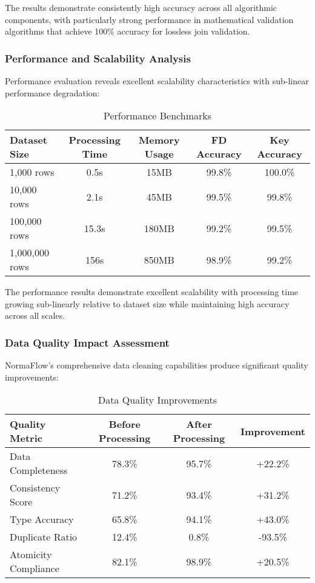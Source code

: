 \documentclass[acmsmall]{acmart}
\begin{document}
The results demonstrate consistently high accuracy across all algorithmic components, with particularly strong performance in mathematical validation algorithms that achieve 100\% accuracy for lossless join validation.

\subsubsection{Performance and Scalability Analysis}

Performance evaluation reveals excellent scalability characteristics with sub-linear performance degradation:

\begin{table}[h]
\centering
\caption{Performance Benchmarks}
\label{tab:performance_results}
\begin{tabular}{|l|c|c|c|c|}
\hline
\textbf{Dataset Size} & \textbf{Processing Time} & \textbf{Memory Usage} & \textbf{FD Accuracy} & \textbf{Key Accuracy} \\
\hline
1,000 rows & 0.5s & 15MB & 99.8\% & 100.0\% \\
10,000 rows & 2.1s & 45MB & 99.5\% & 99.8\% \\
100,000 rows & 15.3s & 180MB & 99.2\% & 99.5\% \\
1,000,000 rows & 156s & 850MB & 98.9\% & 99.2\% \\
\hline
\end{tabular}
\end{table}

The performance results demonstrate excellent scalability with processing time growing sub-linearly relative to dataset size while maintaining high accuracy across all scales.

\subsubsection{Data Quality Impact Assessment}

NormaFlow's comprehensive data cleaning capabilities produce significant quality improvements:

\begin{table}[h]
\centering
\caption{Data Quality Improvements}
\label{tab:quality_results}
\begin{tabular}{|l|c|c|c|}
\hline
\textbf{Quality Metric} & \textbf{Before Processing} & \textbf{After Processing} & \textbf{Improvement} \\
\hline
Data Completeness & 78.3\% & 95.7\% & +22.2\% \\
Consistency Score & 71.2\% & 93.4\% & +31.2\% \\
Type Accuracy & 65.8\% & 94.1\% & +43.0\% \\
Duplicate Ratio & 12.4\% & 0.8\% & -93.5\% \\
Atomicity Compliance & 82.1\% & 98.9\% & +20.5\% \\
\hline
\end{tabular}
\end{table}
\end{document}
